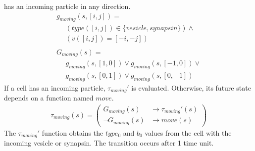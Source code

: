 \documentclass{acm_proc_article-sp}
\begin{document}
has an incoming particle in any direction.
\begin{displaymath} \begin{array}{l}
g_{moving}(s, [i, j]) = \\
\hspace{16pt} (type([i, j]) \in \{ vesicle, synapsin\}) \wedge \\
\hspace{16pt} (v([i, j]) = [-i, -j]) \\
\\
G_{moving}(s) = \\
\hspace{16pt} g_{moving}(s, [1, 0]) \vee g_{moving}(s, [-1, 0]) \vee \\
\hspace{16pt} g_{moving}(s, [0, 1]) \vee g_{moving}(s, [0, -1])
\end{array} \end{displaymath}
If a cell has an incoming particle, $\tau_{moving}'$ 
is evaluated.  Otherwise, its future state depends on
a function named $move$.
\begin{displaymath} \begin{array}{l}
\tau_{moving}(s) = \left( \begin{array}{ll} G_{moving}(s)      & \rightarrow \tau_{moving}'(s) \\
                                            \neg G_{moving}(s) & \rightarrow move(s) \end{array} \right)
\end{array} \end{displaymath}
The $\tau_{moving}'$ function obtains the $type_0$ 
and $b_0$ values from the cell with the incoming
vesicle or synapsin.  The transition occurs after 
1 time unit.
\end{document}
